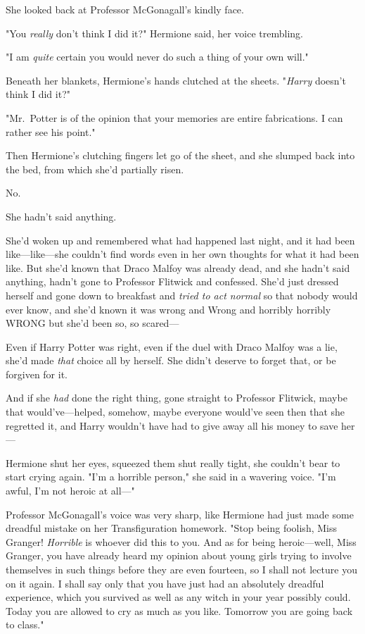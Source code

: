 She looked back at Professor McGonagall's kindly face.

"You \emph{really} don't think I did it?" Hermione said, her voice trembling.

"I am \emph{quite} certain you would never do such a thing of your own will."

Beneath her blankets, Hermione's hands clutched at the sheets. "\emph{Harry}
doesn't think I did it?"

"Mr.~Potter is of the opinion that your memories are entire fabrications. I can
rather see his point."

Then Hermione's clutching fingers let go of the sheet, and she slumped back
into the bed, from which she'd partially risen.

No.

She hadn't said anything.

She'd woken up and remembered what had happened last night, and it had been
like---like---she couldn't find words even in her own thoughts for what it had
been like. But she'd known that Draco Malfoy was already dead, and she hadn't
said anything, hadn't gone to Professor Flitwick and confessed. She'd just
dressed herself and gone down to breakfast and \emph{tried to act normal} so
that nobody would ever know, and she'd known it was wrong and Wrong and
horribly horribly WRONG but she'd been so, so scared---

Even if Harry Potter was right, even if the duel with Draco Malfoy was a lie,
she'd made \emph{that} choice all by herself. She didn't deserve to forget
that, or be forgiven for it.

And if she \emph{had} done the right thing, gone straight to Professor
Flitwick, maybe that would've---helped, somehow, maybe everyone would've seen
then that she regretted it, and Harry wouldn't have had to give away all his
money to save her---

Hermione shut her eyes, squeezed them shut really tight, she couldn't bear to
start crying again. "I'm a horrible person," she said in a wavering voice. "I'm
awful, I'm not heroic at all---"

Professor McGonagall's voice was very sharp, like Hermione had just made some
dreadful mistake on her Transfiguration homework. "Stop being foolish, Miss
Granger! \emph{Horrible} is whoever did this to you. And as for being
heroic---well, Miss Granger, you have already heard my opinion about young
girls trying to involve themselves in such things before they are even
fourteen, so I shall not lecture you on it again. I shall say only that you
have just had an absolutely dreadful experience, which you survived as well as
any witch in your year possibly could. Today you are allowed to cry as much as
you like. Tomorrow you are going back to class."

